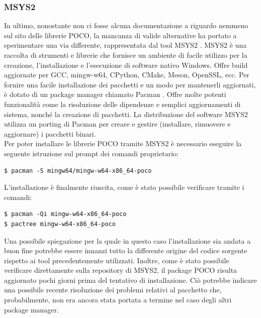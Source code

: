 \subsubsection{MSYS2}
In ultimo, nonostante non ci fosse alcuna documentazione a riguardo nemmeno sul sito delle librerie POCO, la mancanza di valide alternative ha portato a sperimentare una via differente, rappresentata dal tool MSYS2 \cite{MSYS2}. MSYS2 è una raccolta di strumenti e librerie che fornisce un ambiente di facile utilizzo per la creazione, l'installazione e l'esecuzione di software nativo Windows. Offre build aggiornate per GCC, mingw-w64, CPython, CMake, Meson, OpenSSL, ecc. Per fornire una facile installazione dei pacchetti e un modo per mantenerli aggiornati, è dotato di un package manager chiamato Pacman \cite{Pacman}. Offre molte potenti funzionalità come la risoluzione delle dipendenze e semplici aggiornamenti di sistema, nonché la creazione di pacchetti. La distribuzione del software MSYS2 utilizza un porting di Pacman per creare e gestire (installare, rimuovere e aggiornare) i pacchetti binari.\\
Per poter installare le librerie POCO tramite MSYS2 è necessario eseguire la seguente istruzione sul prompt dei comandi proprietario:
\begin{verbatim}
$ pacman -S mingw64/mingw-w64-x86_64-poco
\end{verbatim}
L’installazione è finalmente riuscita, come è stato possibile verificare tramite i comandi:
\begin{verbatim}
$ pacman -Qi mingw-w64-x86_64-poco
$ pactree mingw-w64-x86_64-poco
\end{verbatim}
Una possibile spiegazione per la quale in questo caso l’installazione sia andata a buon fine potrebbe essere innanzi tutto la differente origine del codice sorgente rispetto ai tool precedentemente utilizzati. Inoltre, come è stato possibile verificare direttamente sulla repository di MSYS2, il package POCO risulta aggiornato pochi giorni prima del tentativo di installazione. Ciò potrebbe indicare una possibile recente risoluzione dei problemi relativi al pacchetto che, probabilmente, non era ancora stata portata a termine nel caso degli altri package manager.
\newpage
